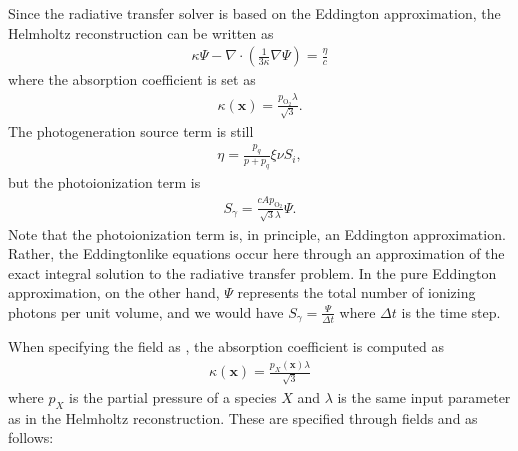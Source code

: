 \documentclass[letterpaper,10pt,english]{sphinxmanual}
\begin{document}
Since the radiative transfer solver is based on the Eddington approximation, the Helmholtz reconstruction can be written as
\begin{equation*}
\begin{split}\kappa \Psi - \nabla\cdot\left(\frac{1}{3\kappa}\nabla \Psi\right) = \frac{\eta}{c}\end{split}
\end{equation*}
where the absorption coefficient is set as
\begin{equation*}
\begin{split}\kappa(\mathbf{x}) = \frac{p_{\textrm{O}_2}\lambda}{\sqrt{3}}.\end{split}
\end{equation*}
The photogeneration source term is still
\begin{equation*}
\begin{split}\eta = \frac{p_q}{p + p_q}\xi\nu S_i,\end{split}
\end{equation*}
but the photoionization term is
\begin{equation*}
\begin{split}S_\gamma = \frac{c A p_{\textrm{O}_2}}{\sqrt{3}\lambda}\Psi.\end{split}
\end{equation*}
Note that the photoionization term is, in principle,  an Eddington approximation.
Rather, the Eddington\sphinxhyphen{}like equations occur here through an approximation of the exact integral solution to the radiative transfer problem.
In the pure Eddington approximation, on the other hand, \(\Psi\) represents the total number of ionizing photons per unit volume, and we would have \(S_\gamma = \frac{\Psi}{\Delta t}\) where \(\Delta t\) is the time step.

When specifying the  field as , the absorption coefficient is computed as
\begin{equation*}
\begin{split}\kappa(\mathbf{x}) = \frac{p_X\left(\mathbf{x}\right)\lambda}{\sqrt{3}}\end{split}
\end{equation*}
where \(p_X\) is the partial pressure of a species \(X\) and \(\lambda\) is the same input parameter as in the Helmholtz reconstruction.
These are specified through fields  and  as follows:
\end{document}
